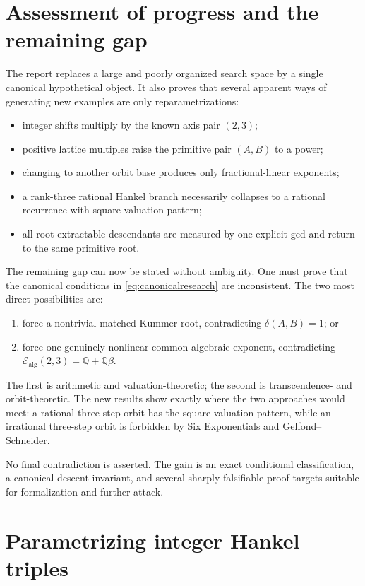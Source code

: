 \documentclass[11pt]{article}
\numberwithin{equation}{section}
\theoremstyle{definition}
\newcommand{\Q}{\mathbb{Q}}
\newcommand{\defect}{\delta}
\newcommand{\Ealg}{\mathcal E_{\mathrm{alg}}}
\begin{document}
\section{Assessment of progress and the remaining gap}

The report replaces a large and poorly organized search space by a single canonical hypothetical object. It also proves that several apparent ways of generating new examples are only reparametrizations:
\begin{itemize}
\item integer shifts multiply by the known axis pair \((2,3)\);
\item positive lattice multiples raise the primitive pair \((A,B)\) to a power;
\item changing to another orbit base produces only fractional-linear exponents;
\item a rank-three rational Hankel branch necessarily collapses to a rational recurrence with square valuation pattern;
\item all root-extractable descendants are measured by one explicit gcd and return to the same primitive root.
\end{itemize}

The remaining gap can now be stated without ambiguity. One must prove that the canonical conditions in \eqref{eq:canonicalresearch} are inconsistent. The two most direct possibilities are:
\begin{enumerate}
\item force a nontrivial matched Kummer root, contradicting \(\defect(A,B)=1\); or
\item force one genuinely nonlinear common algebraic exponent, contradicting \(\Ealg(2,3)=\Q+\Q\beta\).
\end{enumerate}
The first is arithmetic and valuation-theoretic; the second is transcendence- and orbit-theoretic. The new results show exactly where the two approaches would meet: a rational three-step orbit has the square valuation pattern, while an irrational three-step orbit is forbidden by Six Exponentials and Gelfond--Schneider.

No final contradiction is asserted. The gain is an exact conditional classification, a canonical descent invariant, and several sharply falsifiable proof targets suitable for formalization and further attack.

\appendix

\section{Parametrizing integer Hankel triples}
\end{document}
